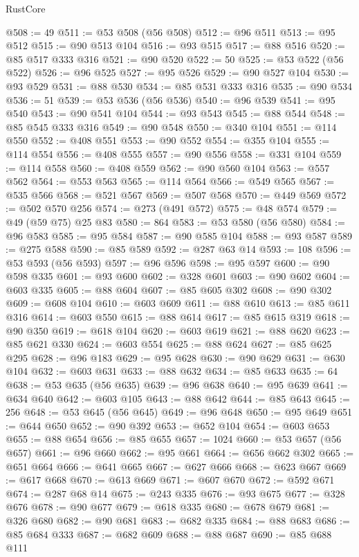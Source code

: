 \begin{lexlean}{RustCore}
\begin{coremodule}
@508 := 49
@511 := @53 @508 (@56 @508)
@512 := @96 @511
@513 := @95 @512
@515 := @90 @513 @104
@516 := @93 @515
@517 := @88 @516
@520 := @85 @517 @333 @316
@521 := @90 @520
@522 := 50
@525 := @53 @522 (@56 @522)
@526 := @96 @525
@527 := @95 @526
@529 := @90 @527 @104
@530 := @93 @529
@531 := @88 @530
@534 := @85 @531 @333 @316
@535 := @90 @534
@536 := 51
@539 := @53 @536 (@56 @536)
@540 := @96 @539
@541 := @95 @540
@543 := @90 @541 @104
@544 := @93 @543
@545 := @88 @544
@548 := @85 @545 @333 @316
@549 := @90 @548
@550 := @340 @104
@551 := @114 @550
@552 := @408 @551
@553 := @90 @552
@554 := @355 @104
@555 := @114 @554
@556 := @408 @555
@557 := @90 @556
@558 := @331 @104
@559 := @114 @558
@560 := @408 @559
@562 := @90 @560 @104
@563 := @557 @562
@564 := @553 @563
@565 := @114 @564
@566 := @549 @565
@567 := @535 @566
@568 := @521 @567
@569 := @507 @568
@570 := @449 @569
@572 := @502 @570 @256
@574 := @273 (@491 @572)
@575 := @48 @574
@579 := @49 (@59 @75) @25 @83
@580 := 864
@583 := @53 @580 (@56 @580)
@584 := @96 @583
@585 := @95 @584
@587 := @90 @585 @104
@588 := @93 @587
@589 := @275 @588
@590 := @85 @589
@592 := @287 @63 @14
@593 := 108
@596 := @53 @593 (@56 @593)
@597 := @96 @596
@598 := @95 @597
@600 := @90 @598 @335
@601 := @93 @600
@602 := @328 @601
@603 := @90 @602
@604 := @603 @335
@605 := @88 @604
@607 := @85 @605 @302
@608 := @90 @302
@609 := @608 @104
@610 := @603 @609
@611 := @88 @610
@613 := @85 @611 @316
@614 := @603 @550
@615 := @88 @614
@617 := @85 @615 @319
@618 := @90 @350
@619 := @618 @104
@620 := @603 @619
@621 := @88 @620
@623 := @85 @621 @330
@624 := @603 @554
@625 := @88 @624
@627 := @85 @625 @295
@628 := @96 @183
@629 := @95 @628
@630 := @90 @629
@631 := @630 @104
@632 := @603 @631
@633 := @88 @632
@634 := @85 @633
@635 := 64
@638 := @53 @635 (@56 @635)
@639 := @96 @638
@640 := @95 @639
@641 := @634 @640
@642 := @603 @105
@643 := @88 @642
@644 := @85 @643
@645 := 256
@648 := @53 @645 (@56 @645)
@649 := @96 @648
@650 := @95 @649
@651 := @644 @650
@652 := @90 @392
@653 := @652 @104
@654 := @603 @653
@655 := @88 @654
@656 := @85 @655
@657 := 1024
@660 := @53 @657 (@56 @657)
@661 := @96 @660
@662 := @95 @661
@664 := @656 @662 @302
@665 := @651 @664
@666 := @641 @665
@667 := @627 @666
@668 := @623 @667
@669 := @617 @668
@670 := @613 @669
@671 := @607 @670
@672 := @592 @671
@674 := @287 @68 @14
@675 := @243 @335
@676 := @93 @675
@677 := @328 @676
@678 := @90 @677
@679 := @618 @335
@680 := @678 @679
@681 := @326 @680
@682 := @90 @681
@683 := @682 @335
@684 := @88 @683
@686 := @85 @684 @333
@687 := @682 @609
@688 := @88 @687
@690 := @85 @688 @111

\end{coremodule}
\end{lexlean}
